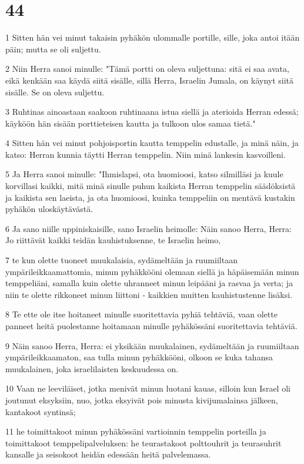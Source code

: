 \chapter{44}

\par 1 Sitten hän vei minut takaisin pyhäkön ulommalle portille, sille, joka antoi itään päin; mutta se oli suljettu.
\par 2 Niin Herra sanoi minulle: "Tämä portti on oleva suljettuna: sitä ei saa avata, eikä kenkään saa käydä siitä sisälle, sillä Herra, Israelin Jumala, on käynyt siitä sisälle. Se on oleva suljettu.
\par 3 Ruhtinas ainoastaan saakoon ruhtinaana istua siellä ja aterioida Herran edessä; käyköön hän sisään porttieteisen kautta ja tulkoon ulos samaa tietä."
\par 4 Sitten hän vei minut pohjoisportin kautta temppelin edustalle, ja minä näin, ja katso: Herran kunnia täytti Herran temppelin. Niin minä lankesin kasvoilleni.
\par 5 Ja Herra sanoi minulle: "Ihmislapsi, ota huomioosi, katso silmilläsi ja kuule korvillasi kaikki, mitä minä sinulle puhun kaikista Herran temppelin säädöksistä ja kaikista sen laeista, ja ota huomioosi, kuinka temppeliin on mentävä kustakin pyhäkön uloskäytävästä.
\par 6 Ja sano niille uppiniskaisille, sano Israelin heimolle: Näin sanoo Herra, Herra: Jo riittävät kaikki teidän kauhistuksenne, te Israelin heimo,
\par 7 te kun olette tuoneet muukalaisia, sydämeltään ja ruumiiltaan ympärileikkaamattomia, minun pyhäkkööni olemaan siellä ja häpäisemään minun temppeliäni, samalla kuin olette uhranneet minun leipääni ja rasvaa ja verta; ja niin te olette rikkoneet minun liittoni - kaikkien muitten kauhistustenne lisäksi.
\par 8 Te ette ole itse hoitaneet minulle suoritettavia pyhiä tehtäviä, vaan olette panneet heitä puolestanne hoitamaan minulle pyhäkössäni suoritettavia tehtäviä.
\par 9 Näin sanoo Herra, Herra: ei yksikään muukalainen, sydämeltään ja ruumiiltaan ympärileikkaamaton, saa tulla minun pyhäkkööni, olkoon se kuka tahansa muukalainen, joka israelilaisten keskuudessa on.
\par 10 Vaan ne leeviläiset, jotka menivät minun luotani kauas, silloin kun Israel oli joutunut eksyksiin, nuo, jotka eksyivät pois minusta kivijumalainsa jälkeen, kantakoot syntinsä;
\par 11 he toimittakoot minun pyhäkössäni vartioinnin temppelin porteilla ja toimittakoot temppelipalveluksen: he teurastakoot polttouhrit ja teurasuhrit kansalle ja seisokoot heidän edessään heitä palvelemassa.
